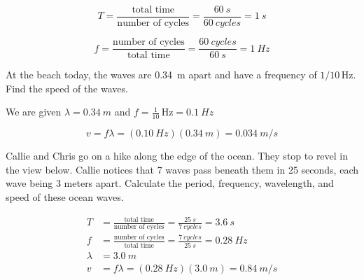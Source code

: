 \documentclass[]{exam}
\begin{document}
\begin{questions}
\begin{solution}
\begin{equation*}
    T = \frac{\text{total time}}{\text{number of cycles}} = \frac{\SI{60}{s}}{\SI{60}{cycles}} = \boxed{\SI{1}{s}}
\end{equation*}

\begin{equation*}
    f = \frac{\text{number of cycles}}{\text{total time}} = \frac{\SI{60}{cycles}}{\SI{60}{s}} = \boxed{\SI{1}{Hz}}
\end{equation*}

\end{solution}

\question
At the beach today, the waves are \SI{0.34}{m} apart and have a frequency of $1/10\,\text{Hz}$. Find the speed of the waves.

\begin{solution}
We are given $\lambda = \SI{0.34}{m}$ and $f = \frac{1}{10}\,\text{Hz} = \SI{0.1}{Hz}$

\begin{equation*}
    v = f\lambda = (\SI{0.10}{Hz})(\SI{0.34}{m}) = \boxed{\SI{0.034}{m/s}}
\end{equation*}
\end{solution}

\question
Callie and Chris go on a hike along the edge of the ocean. They stop to revel in the view below. Callie notices that 7 waves pass beneath them in 25 seconds, each wave being 3 meters apart. Calculate the period, frequency, wavelength, and speed of these ocean waves.

\begin{solution}
\begin{align*}
    T &= \frac{\text{total time}}{\text{number of cycles}} = \frac{\SI{25}{s}}{\SI{7}{cycles}} = \boxed{\SI{3.6}{s}} \\[1ex]
    f &= \frac{\text{number of cycles}}{\text{total time}} = \frac{\SI{7}{cycles}}{\SI{25}{s}} = \boxed{\SI{0.28}{Hz}} \\[1ex]
    \lambda &= \boxed{\SI{3.0}{m}} \\[1ex] 
    v &= f \lambda = (\SI{0.28}{Hz})(\SI{3.0}{m}) = \boxed{\SI{0.84}{m/s}}
\end{align*}

\end{solution}

\end{questions}

\clearpage
\end{document}
